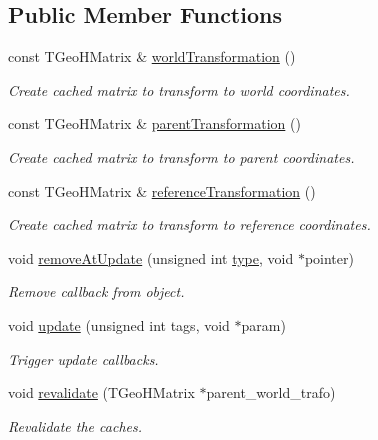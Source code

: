 \subsection*{Public Member Functions}
\begin{DoxyCompactItemize}
\item 
const TGeoHMatrix \& \hyperlink{class_d_d4hep_1_1_geometry_1_1_det_element_object_acb5621525dd6d99d263424e298a4002b}{worldTransformation} ()
\begin{DoxyCompactList}\small\item\em Create cached matrix to transform to world coordinates. \item\end{DoxyCompactList}\item 
const TGeoHMatrix \& \hyperlink{class_d_d4hep_1_1_geometry_1_1_det_element_object_a9db522499c3fbe2f11ae195cfd4f5e03}{parentTransformation} ()
\begin{DoxyCompactList}\small\item\em Create cached matrix to transform to parent coordinates. \item\end{DoxyCompactList}\item 
const TGeoHMatrix \& \hyperlink{class_d_d4hep_1_1_geometry_1_1_det_element_object_a728e600b6e565f6fb2174e36422ef1bc}{referenceTransformation} ()
\begin{DoxyCompactList}\small\item\em Create cached matrix to transform to reference coordinates. \item\end{DoxyCompactList}\item 
void \hyperlink{class_d_d4hep_1_1_geometry_1_1_det_element_object_ad0d107dfcc7629eb1009cde63e24981b}{removeAtUpdate} (unsigned int \hyperlink{class_d_d4hep_1_1_named_object_a8e17bb5f854b320302be44c68c39a192}{type}, void $\ast$pointer)
\begin{DoxyCompactList}\small\item\em Remove callback from object. \item\end{DoxyCompactList}\item 
void \hyperlink{class_d_d4hep_1_1_geometry_1_1_det_element_object_a826e6ef5e3869b55970bd7c74f57b3a1}{update} (unsigned int tags, void $\ast$param)
\begin{DoxyCompactList}\small\item\em Trigger update callbacks. \item\end{DoxyCompactList}\item 
void \hyperlink{class_d_d4hep_1_1_geometry_1_1_det_element_object_a30a0085da8a1ef8d1253b37e494df066}{revalidate} (TGeoHMatrix $\ast$parent\_\-world\_\-trafo)
\begin{DoxyCompactList}\small\item\em Revalidate the caches. \item\end{DoxyCompactList}\end{DoxyCompactItemize}
